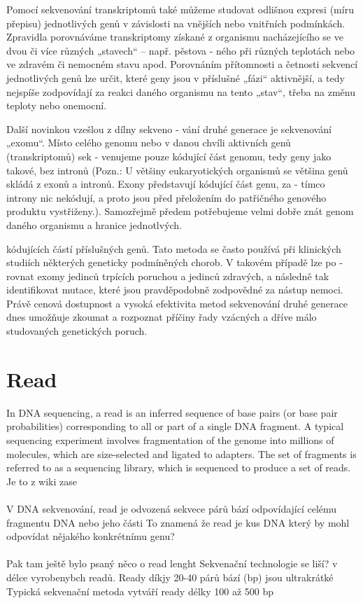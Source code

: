 \documentclass[czech,DP]{thesiskiv}
\begin{document}
Pomocí sekvenování transkriptomů také
můžeme studovat odlišnou expresi (míru
přepisu) jednotlivých genů v závislosti na
vnějších nebo vnitřních podmínkách. Zpravidla porovnáváme transkriptomy získané z organismu nacházejícího se ve dvou
či více různých „stavech“ – např. pěstova -
ného při různých teplotách nebo ve zdravém či nemocném stavu apod. Porovnáním
přítomnosti a četnosti sekvencí jednotlivých genů lze určit, které geny jsou v příslušné „fázi“ aktivnější, a tedy nejspíše
zodpovídají za reakci daného organismu
na tento „stav“, třeba na změnu teploty
nebo onemocní.


Další novinkou vzešlou z dílny sekveno -
vání druhé generace je sekvenování „exomu“. Místo celého genomu nebo v danou
chvíli aktivních genů (transkriptomů) sek -
venujeme pouze kódující část genomu,
tedy geny jako takové, bez intronů (Pozn.:
U většiny eukaryotických organismů se
většina genů skládá z exonů a intronů.
Exony představují kódující část genu, za -
tímco introny nic nekódují, a proto jsou
před přeložením do patřičného genového
produktu vystřiženy.). Samozřejmě předem potřebujeme velmi dobře znát genom
daného organismu a hranice jednotlvých.


kódujících částí příslušných genů. Tato
metoda se často používá při klinických
studiích některých geneticky podmíněných chorob. V takovém případě lze po -
rovnat exomy jedinců trpících poruchou
a jedinců zdravých, a následně tak identifikovat mutace, které jsou pravděpodobně zodpovědné za nástup nemoci. Právě
cenová dostupnost a vysoká efektivita
metod sekvenování druhé generace dnes
umožňuje zkoumat a rozpoznat příčiny
řady vzácných a dříve málo studovaných
genetických poruch.
\section{Read}
In DNA sequencing, a read is an inferred sequence of base pairs (or base pair probabilities) corresponding to all or part of a single DNA fragment. A typical sequencing experiment involves fragmentation of the genome into millions of molecules, which are size-selected and ligated to adapters. The set of fragments is referred to as a sequencing library, which is sequenced to produce a set of reads. Je to z wiki zase
\\
\\
V DNA sekvenování, read je odvozená sekvece párů bází odpovídající celému fragmentu DNA nebo jeho části
To znamená že read je kus DNA který by mohl odpovídat nějakého konkrétnímu genu? 
\\
\\
Pak tam ještě bylo psaný něco o read lenght
Sekvenační technologie se liší? v délce vyrobenybch readů. 
Ready díkjy 20-40 párů bází (bp) jsou ultrakrátké
Typická sekvenační metoda vytváří ready délky 100 až 500 bp
\end{document}
